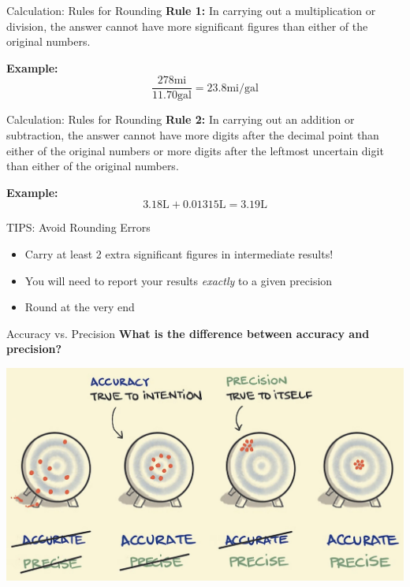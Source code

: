 \documentclass[11pt]{beamer}
\begin{document}
\begin{frame}{Calculation: Rules for Rounding}
  \textbf{Rule 1:} In carrying out a multiplication or division,
  the answer cannot have more significant figures than either of
  the original numbers.

  \textbf{Example:}
  \begin{equation}
    \frac{278 \text{mi}}{11.70 \text{gal}} = 23.8 \text{mi/gal}
  \end{equation}
  
\end{frame}

\begin{frame}{Calculation: Rules for Rounding}
  \textbf{Rule 2:} In carrying out an addition or subtraction, the
  answer cannot have more digits after the decimal point than either
  of the original numbers or more digits after the leftmost uncertain
  digit than either of the original numbers.

  \textbf{Example:}
  \begin{equation}
    3.18 \text{L} + 0.01315 \text{L} = 3.19 \text{L}
  \end{equation}
\end{frame}

\begin{frame}{TIPS: Avoid Rounding Errors}
  \begin{itemize}
  \item Carry at least 2 extra significant figures in
    intermediate results!
  \item You will need to report your results \emph{exactly} to a
    given precision
  \item Round at the very end
  \end{itemize}

\end{frame}

\begin{frame}{Accuracy vs. Precision}
  \textbf{What is the difference between accuracy
    and precision?}

  \centering
  \includegraphics[scale=0.15]{accur_prec.png}
\end{frame}
\end{document}
